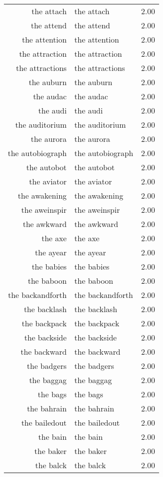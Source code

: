 \begin{table}[ht]
\begin{tabular}{rlr}
  the attach & the attach & 2.00 \\ 
  the attend & the attend & 2.00 \\ 
  the attention & the attention & 2.00 \\ 
  the attraction & the attraction & 2.00 \\ 
  the attractions & the attractions & 2.00 \\ 
  the auburn & the auburn & 2.00 \\ 
  the audac & the audac & 2.00 \\ 
  the audi & the audi & 2.00 \\ 
  the auditorium & the auditorium & 2.00 \\ 
  the aurora & the aurora & 2.00 \\ 
  the autobiograph & the autobiograph & 2.00 \\ 
  the autobot & the autobot & 2.00 \\ 
  the aviator & the aviator & 2.00 \\ 
  the awakening & the awakening & 2.00 \\ 
  the aweinspir & the aweinspir & 2.00 \\ 
  the awkward & the awkward & 2.00 \\ 
  the axe & the axe & 2.00 \\ 
  the ayear & the ayear & 2.00 \\ 
  the babies & the babies & 2.00 \\ 
  the baboon & the baboon & 2.00 \\ 
  the backandforth & the backandforth & 2.00 \\ 
  the backlash & the backlash & 2.00 \\ 
  the backpack & the backpack & 2.00 \\ 
  the backside & the backside & 2.00 \\ 
  the backward & the backward & 2.00 \\ 
  the badgers & the badgers & 2.00 \\ 
  the baggag & the baggag & 2.00 \\ 
  the bags & the bags & 2.00 \\ 
  the bahrain & the bahrain & 2.00 \\ 
  the bailedout & the bailedout & 2.00 \\ 
  the bain & the bain & 2.00 \\ 
  the baker & the baker & 2.00 \\ 
  the balck & the balck & 2.00 \\ 

\end{tabular}
\end{table}
